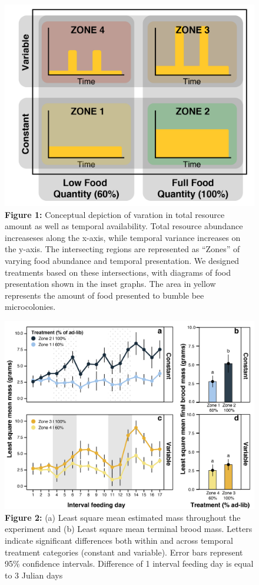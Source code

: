 \documentclass[11pt,]{article}
\begin{document}
\begin{figure}
\centering
\includegraphics{./fig1_conceptual.png}
\caption{\textbf{Figure 1:} Conceptual depiction of varation in total
resource amount as well as temporal availability. Total resource
abundance increaseses along the x-axis, while temporal variance
increases on the y-axis. The intersecting regions are represented as
``Zones'' of varying food abundance and temporal presentation. We
designed treatments based on these intersections, with diagrams of food
presentation shown in the inset graphs. The area in yellow represents
the amount of food presented to bumble bee microcolonies.}
\end{figure}

\begin{figure}
\centering
\includegraphics{./fig2_mc_mass.png}
\caption{\textbf{Figure 2:} (a) Least square mean estimated mass
throughout the experiment and (b) Least square mean terminal brood mass.
Letters indicate significant differences both within and across temporal
treatment categories (constant and variable). Error bars represent 95\%
confidence intervals. Difference of 1 interval feeding day is equal to 3
Julian days}
\end{figure}
\end{document}
